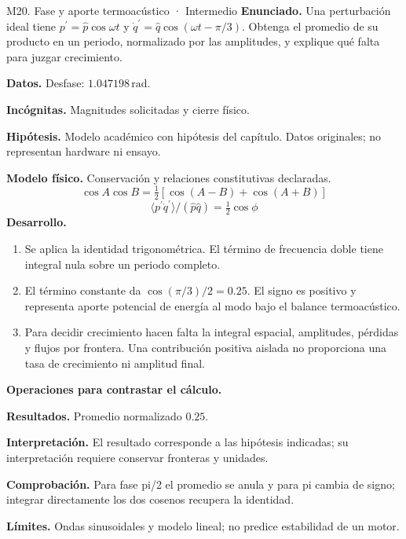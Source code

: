 \begin{studiumworked}{M20. Fase y aporte termoacústico · Intermedio}
\textbf{Enunciado.} Una perturbación ideal tiene $p^\prime=\widehat p\cos\omega t$ y $\dot q^\prime=\widehat q\cos(\omega t-\pi/3)$. Obtenga el promedio de su producto en un periodo, normalizado por las amplitudes, y explique qué falta para juzgar crecimiento.

\textbf{Datos.} Desfase: $1.047198\,\mathrm{rad}$.

\textbf{Incógnitas.} Magnitudes solicitadas y cierre físico.

\textbf{Hipótesis.} Modelo académico con hipótesis del capítulo. Datos originales; no representan hardware ni ensayo.

\textbf{Modelo físico.} Conservación y relaciones constitutivas declaradas.
\[\cos A\cos B=\tfrac12[\cos(A-B)+\cos(A+B)]\]
\[\langle p^\prime\dot q^\prime\rangle/(\widehat p\widehat q)=\tfrac12\cos\phi\]
\textbf{Desarrollo.}
\begin{enumerate}
\item Se aplica la identidad trigonométrica. El término de frecuencia doble tiene integral nula sobre un periodo completo.
\item El término constante da $\cos(\pi/3)/2=0.25$. El signo es positivo y representa aporte potencial de energía al modo bajo el balance termoacústico.
\item Para decidir crecimiento hacen falta la integral espacial, amplitudes, pérdidas y flujos por frontera. Una contribución positiva aislada no proporciona una tasa de crecimiento ni amplitud final.
\end{enumerate}
\textbf{Operaciones para contrastar el cálculo.}

\textbf{Resultados.} Promedio normalizado $0.25$.

\textbf{Interpretación.} El resultado corresponde a las hipótesis indicadas; su interpretación requiere conservar fronteras y unidades.

\textbf{Comprobación.} Para fase pi/2 el promedio se anula y para pi cambia de signo; integrar directamente los dos cosenos recupera la identidad.

\textbf{Límites.} Ondas sinusoidales y modelo lineal; no predice estabilidad de un motor.
\end{studiumworked}
